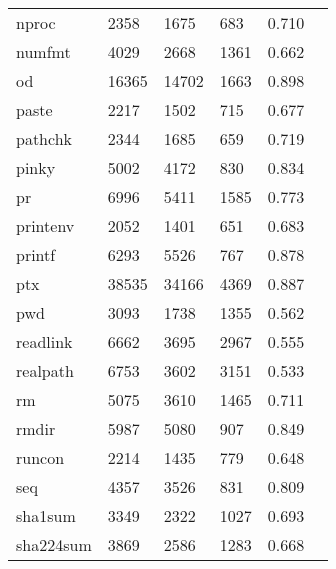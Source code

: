 \begin{longtable}{lp{2.20cm}p{2.20cm}p{2.20cm}p{2.20cm}p{2.20cm}}
nproc     &                     2358 &         1675 &           683 &                    0.710 \\
numfmt    &                     4029 &         2668 &          1361 &                    0.662 \\
od        &                    16365 &        14702 &          1663 &                    0.898 \\
paste     &                     2217 &         1502 &           715 &                    0.677 \\
pathchk   &                     2344 &         1685 &           659 &                    0.719 \\
pinky     &                     5002 &         4172 &           830 &                    0.834 \\
pr        &                     6996 &         5411 &          1585 &                    0.773 \\
printenv  &                     2052 &         1401 &           651 &                    0.683 \\
printf    &                     6293 &         5526 &           767 &                    0.878 \\
ptx       &                    38535 &        34166 &          4369 &                    0.887 \\
pwd       &                     3093 &         1738 &          1355 &                    0.562 \\
readlink  &                     6662 &         3695 &          2967 &                    0.555 \\
realpath  &                     6753 &         3602 &          3151 &                    0.533 \\
rm        &                     5075 &         3610 &          1465 &                    0.711 \\
rmdir     &                     5987 &         5080 &           907 &                    0.849 \\
runcon    &                     2214 &         1435 &           779 &                    0.648 \\
seq       &                     4357 &         3526 &           831 &                    0.809 \\
sha1sum   &                     3349 &         2322 &          1027 &                    0.693 \\
sha224sum &                     3869 &         2586 &          1283 &                    0.668 \\

\end{longtable}
